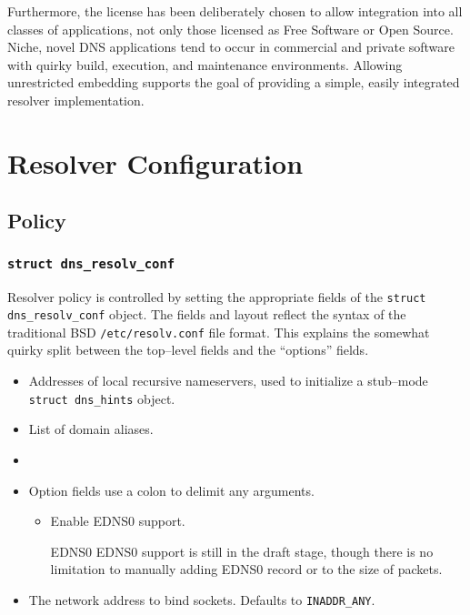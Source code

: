 \documentclass[11pt]{article}
\begin{document}
Furthermore, the license has been deliberately chosen to
allow integration into all classes of applications, not only those licensed
as Free Software or Open Source. Niche, novel DNS applications tend to occur
in commercial and private software with quirky build, execution, and
maintenance environments. Allowing unrestricted embedding supports the goal
of providing a simple, easily integrated resolver implementation.

\section{Resolver Configuration}

\subsection{Policy}

\subsubsection{\texttt{struct dns\_resolv\_conf}}

Resolver policy is controlled by setting the appropriate fields of the
\texttt{struct dns\_resolv\_conf} object. The fields and layout reflect the
syntax of the traditional BSD \texttt{/etc/resolv.conf} file format. This
explains the somewhat quirky split between the top--level fields and the
``options'' fields.

\begin{itemize}
\item[\texttt{.nameserver}] Addresses of local recursive nameservers, used
to initialize a stub--mode \texttt{struct dns\_hints} object.
\item[\texttt{.search}] List of domain aliases.
\item[\texttt{.lookup}]
\item[\texttt{.options}] Option fields use a colon to delimit any arguments.
\begin{itemize}
\item[\texttt{.edns0}] Enable EDNS0 support. \\
\begin{todo}{EDNS0}
EDNS0 support is still in the draft stage, though there is no limitation
to manually adding EDNS0 record or to the size of packets.
\end{todo}
\end{itemize}
\item[\texttt{.iface}] The network address to bind sockets. Defaults to \texttt{INADDR\_ANY}.
\end{itemize}
\end{document}
